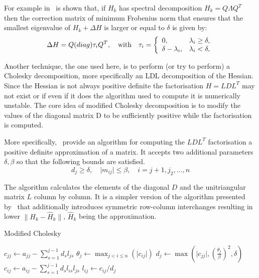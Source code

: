 \documentclass[11pt]{article}
\begin{document}
    For example in~\cite{cheng1998modified} is shown that, if $H_k$ has spectral decomposition $H_k = Q \Lambda Q^T$ then the correction matrix of minimum Frobenius norm that ensures that the smallest eigenvalue of $H_k + \Delta H$ is larger or equal to $\delta$ is given by:
    \begin{equation*}
        \Delta H = Q \text(diag){\tau_i} Q^T, \quad \text{with} \quad \tau_i =
        \left\{
        \begin{array}{ll}
            0,                  & \lambda_i \geq \delta, \\
            \delta - \lambda_i, & \lambda_i < \delta,
        \end{array}
        \right.
    \end{equation*}

    Another technique, the one used here, is to perform (or try to perform) a Cholesky decomposition, more specifically an LDL decomposition of the Hessian.
    Since the Hessian is not always positive definite the factorisation $H = LDL^T$ may not exist or if even if it does the algorithm used to compute it is numerically unstable.
    The core idea of modified Cholesky decomposition is to modify the values of the diagonal matrix D to be sufficiently positive while the factorisation is computed.

    More specifically,~\cite{wright2006numerical} provide an algorithm for computing the $LDL^T$ factorisation a positive definite approximation of a matrix.
    It accepts two additional parameters $\delta, \beta$ so that the following bounds are satisfied.
    \begin{equation}
        d_j \geq \delta, \quad \lvert m_{ij} \rvert \leq \beta, \quad i = j+1, j_2, \dots, n
    \end{equation}

    The algorithm calculates the elements of the diagonal $D$ and the unitriangular matrix $L$ column by column.
    It is a simpler version of the algorithm presented by~\cite{gill2019practical} that additionally introduces symmetric row-column interchanges resulting in lower $ \lVert H_k - \hat{H}_k \rVert$, $\hat{H}_k$ being the approximation.

    \begin{algorithm}
        \caption{Modified Cholesky}
        \begin{algorithmic}
                \State $c_{jj} \gets a_{jj} - \sum_{s=1}^{j-1} d_s l_{js}$
                \State $\theta_j \gets \max_{j<i\leq n}(\lvert c_{ij} \rvert)$
                \State $d_j \gets  \max
                \left(
                \lvert c_{jj} \rvert,
                \left( \frac{\theta_j}{\beta} \right)^2,
                \delta \right)$
                    \State $c_{ij} \gets a_{ij} - \sum_{s=1}^{j-1} d_s l_{is} l_{js}$
                    \State $l_{ij} \gets c_{ij} / d_j$
                \EndFor
            \EndFor
        \end{algorithmic}
    \end{algorithm}
\end{document}
